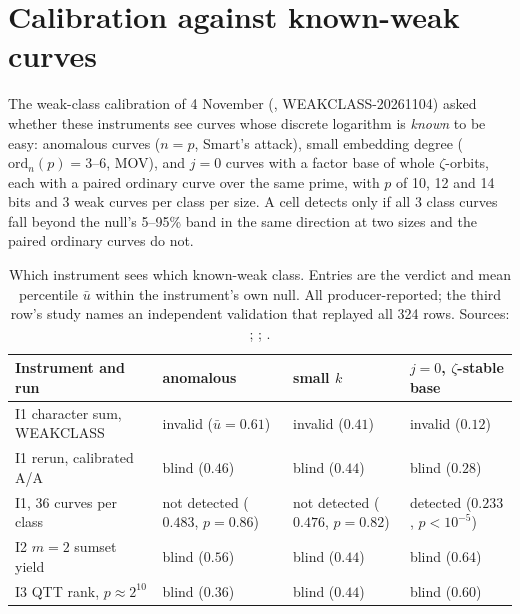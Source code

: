 \section{Calibration against known-weak curves}\label{sec:ln-weak}

The weak-class calibration of 4 November
(,
WEAKCLASS-20261104) asked whether these instruments see curves whose
discrete logarithm is \emph{known} to be easy: anomalous curves ($n=p$,
Smart's attack), small embedding degree ($\mathrm{ord}_n(p)=3$--6, MOV), and
$j=0$ curves with a factor base of whole $\zeta$-orbits, each with a paired
ordinary curve over the same prime, with $p$ of 10, 12 and 14 bits and 3
weak curves per class per size. A cell
detects only if all 3 class curves fall beyond the null's 5--95\% band in the
same direction at two sizes and the paired ordinary curves do not.

\begin{table}[t]
\centering\small
\begin{tabularx}{\linewidth}{@{}Xlll@{}}
\toprule
Instrument and run & anomalous & small $k$ & $j=0$, $\zeta$-stable base \\
\midrule
I1 character sum, WEAKCLASS & invalid ($\bar u=0.61$) & invalid ($0.41$) & invalid ($0.12$) \\
I1 rerun, calibrated A/A & blind ($0.46$) & blind ($0.44$) & blind ($0.28$) \\
I1, 36 curves per class & not detected ($0.483$, $p=0.86$) & not detected ($0.476$, $p=0.82$) & detected ($0.233$, $p<10^{-5}$) \\
I2 $m=2$ sumset yield & blind ($0.56$) & blind ($0.44$) & blind ($0.64$) \\
I3 QTT rank, $p\approx2^{10}$ & blind ($0.36$) & blind ($0.44$) & blind ($0.60$) \\
\bottomrule
\end{tabularx}
\caption[]{Which instrument sees which known-weak class. Entries are the
verdict and mean percentile $\bar u$ within the instrument's own null. All
producer-reported; the third row's study names an independent validation
that replayed all 324 rows. Sources:
;
;
.}
\label{tab:ln-weak}
\end{table}

